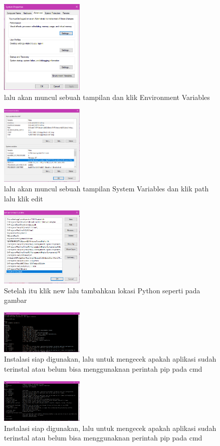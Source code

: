 	\begin{figure}[H]
		\includegraphics[width=4cm]{figures/1184065/EnvironmentVar.PNG}
		\centering
		\caption{lalu akan muncul sebuah tampilan dan klik Environment Variables }
	\end{figure}
	\begin{figure}[H]
		\includegraphics[width=4cm]{figures/1184065/EnvironmentPath.PNG}
		\centering
		\caption{lalu akan muncul sebuah tampilan System Variables dan klik path lalu klik edit}
	\end{figure}
	\begin{figure}[H]
		\includegraphics[width=4cm]{figures/1184065/TambahPython35.PNG}
		\centering
		\caption{Setelah itu klik new lalu tambahkan lokasi Python seperti pada gambar}
	\end{figure}
	\begin{figure}[H]
		\includegraphics[width=4cm]{figures/1184065/HasilPIP1.PNG}
		\centering
		\caption{Instalasi siap digunakan, lalu untuk mengecek apakah aplikasi sudah terinstal atau belum bisa menggunaknan perintah pip pada cmd}
	\end{figure}
	\begin{figure}[H]
		\includegraphics[width=4cm]{figures/1184065/HasilPIP2.PNG}
		\centering
		\caption{Instalasi siap digunakan, lalu untuk mengecek apakah aplikasi sudah terinstal atau belum bisa menggunaknan perintah pip pada cmd}
	\end{figure}      

